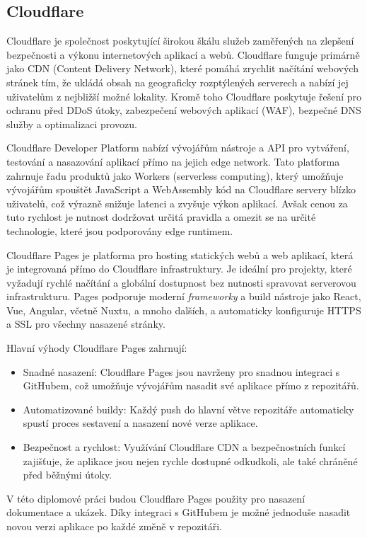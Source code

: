 \subsection{Cloudflare}
Cloudflare je společnost poskytující širokou škálu služeb zaměřených na zlepšení bezpečnosti a výkonu internetových aplikací a webů. Cloudflare funguje primárně jako CDN (Content Delivery Network), které pomáhá zrychlit načítání webových stránek tím, že ukládá obsah na geograficky rozptýlených serverech a nabízí jej uživatelům z nejbližší možné lokality. Kromě toho Cloudflare poskytuje řešení pro ochranu před DDoS útoky, zabezpečení webových aplikací (WAF), bezpečné DNS služby a optimalizaci provozu. \cite{Cloudflare}

Cloudflare Developer Platform nabízí vývojářům nástroje a API pro vytváření, testování a nasazování aplikací přímo na jejich edge network. Tato platforma zahrnuje řadu produktů jako Workers (serverless computing), který umožňuje vývojářům spouštět JavaScript a WebAssembly kód na Cloudflare servery blízko uživatelů, což výrazně snižuje latenci a zvyšuje výkon aplikací. Avšak cenou za tuto rychlost je nutnost dodržovat určitá pravidla a omezit se na určité technologie, které jsou podporovány edge runtimem. \cite{CloudflareDeveloperPlatform}

Cloudflare Pages je platforma pro hosting statických webů a web aplikací, která je integrovaná přímo do Cloudflare infrastruktury. Je ideální pro projekty, které vyžadují rychlé načítání a globální dostupnost bez nutnosti spravovat serverovou infrastrukturu. Pages podporuje moderní \emph{frameworky} a build nástroje jako React, Vue, Angular, včetně Nuxtu, a mnoho dalších, a automaticky konfiguruje HTTPS a SSL pro všechny nasazené stránky. \cite{CloudflarePages}

Hlavní výhody Cloudflare Pages zahrnují:

\begin{itemize}
    \item Snadné nasazení: Cloudflare Pages jsou navrženy pro snadnou integraci s GitHubem, což umožňuje vývojářům nasadit své aplikace přímo z repozitářů.
    \item Automatizované buildy: Každý push do hlavní větve repozitáře automaticky spustí proces sestavení a nasazení nové verze aplikace.
    \item Bezpečnost a rychlost: Využívání Cloudflare CDN a bezpečnostních funkcí zajišťuje, že aplikace jsou nejen rychle dostupné odkudkoli, ale také chráněné před běžnými útoky.
\end{itemize}

V této diplomové práci budou Cloudflare Pages použity pro nasazení dokumentace a ukázek. Díky integraci s GitHubem je možné jednoduše nasadit novou verzi aplikace po každé změně v repozitáři.

